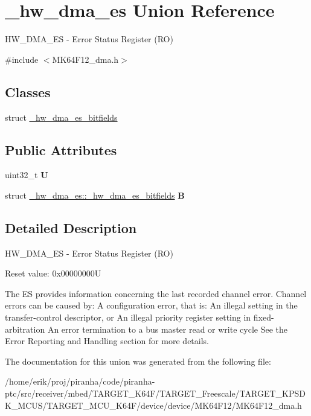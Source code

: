 \hypertarget{union__hw__dma__es}{}\section{\+\_\+hw\+\_\+dma\+\_\+es Union Reference}
\label{union__hw__dma__es}


H\+W\+\_\+\+D\+M\+A\+\_\+\+ES -\/ Error Status Register (RO)  




{\ttfamily \#include $<$M\+K64\+F12\+\_\+dma.\+h$>$}

\subsection*{Classes}
\begin{DoxyCompactItemize}
\item 
struct \hyperlink{struct__hw__dma__es_1_1__hw__dma__es__bitfields}{\+\_\+hw\+\_\+dma\+\_\+es\+\_\+bitfields}
\end{DoxyCompactItemize}
\subsection*{Public Attributes}
\begin{DoxyCompactItemize}
\item 
uint32\+\_\+t {\bfseries U}\hypertarget{union__hw__dma__es_a292a43ee4ec1aa43fa01075056d83b9d}{}\label{union__hw__dma__es_a292a43ee4ec1aa43fa01075056d83b9d}

\item 
struct \hyperlink{struct__hw__dma__es_1_1__hw__dma__es__bitfields}{\+\_\+hw\+\_\+dma\+\_\+es\+::\+\_\+hw\+\_\+dma\+\_\+es\+\_\+bitfields} {\bfseries B}\hypertarget{union__hw__dma__es_afee0640d857671a6dc463c23cca46d23}{}\label{union__hw__dma__es_afee0640d857671a6dc463c23cca46d23}

\end{DoxyCompactItemize}


\subsection{Detailed Description}
H\+W\+\_\+\+D\+M\+A\+\_\+\+ES -\/ Error Status Register (RO) 

Reset value\+: 0x00000000U

The ES provides information concerning the last recorded channel error. Channel errors can be caused by\+: A configuration error, that is\+: An illegal setting in the transfer-\/control descriptor, or An illegal priority register setting in fixed-\/arbitration An error termination to a bus master read or write cycle See the Error Reporting and Handling section for more details. 

The documentation for this union was generated from the following file\+:\begin{DoxyCompactItemize}
\item 
/home/erik/proj/piranha/code/piranha-\/ptc/src/receiver/mbed/\+T\+A\+R\+G\+E\+T\+\_\+\+K64\+F/\+T\+A\+R\+G\+E\+T\+\_\+\+Freescale/\+T\+A\+R\+G\+E\+T\+\_\+\+K\+P\+S\+D\+K\+\_\+\+M\+C\+U\+S/\+T\+A\+R\+G\+E\+T\+\_\+\+M\+C\+U\+\_\+\+K64\+F/device/device/\+M\+K64\+F12/M\+K64\+F12\+\_\+dma.\+h\end{DoxyCompactItemize}
